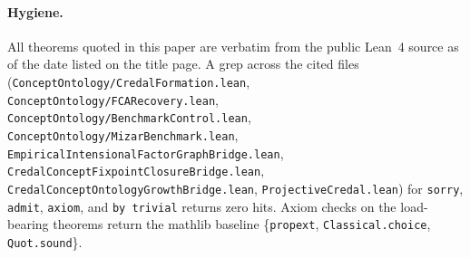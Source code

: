 \documentclass[]{article}
\newcommand{\lid}[1]{{\ttfamily\nolinkurl{#1}}}
\newcommand{\lpath}[1]{\texttt{\nolinkurl{#1}}}
\begin{document}
\paragraph{Hygiene.} All theorems quoted in this paper are verbatim from the
public Lean~4 source as of the date listed on the title page. A grep across the
cited files (\lpath{ConceptOntology/CredalFormation.lean},
\lpath{ConceptOntology/FCARecovery.lean},
\lpath{ConceptOntology/BenchmarkControl.lean},
\lpath{ConceptOntology/MizarBenchmark.lean},
\lpath{EmpiricalIntensionalFactorGraphBridge.lean},
\lpath{CredalConceptFixpointClosureBridge.lean},
\lpath{CredalConceptOntologyGrowthBridge.lean},
\lpath{ProjectiveCredal.lean}) for \lid{sorry}, \lid{admit}, \lid{axiom}, and
\lid{by trivial} returns zero hits. Axiom checks on the load-bearing theorems
return the mathlib baseline
\{\lid{propext}, \lid{Classical.choice}, \lid{Quot.sound}\}.
\end{document}
